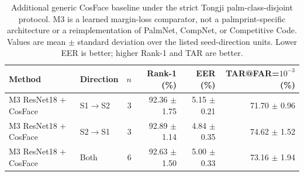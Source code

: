 \begin{table}[t]
\centering
\caption{Additional generic CosFace baseline under the strict Tongji palm-class-disjoint protocol. M3 is a learned margin-loss comparator, not a palmprint-specific architecture or a reimplementation of PalmNet, CompNet, or Competitive Code. Values are mean $\pm$ standard deviation over the listed seed-direction units. Lower EER is better; higher Rank-1 and TAR are better.}
\label{tab:strict_tongji_additional_baselines}
\small
\setlength{\tabcolsep}{4pt}
\begin{tabular}{llrrrr}
\toprule
Method & Direction & $n$ & Rank-1 (\%) & EER (\%) & TAR@FAR=$10^{-3}$ (\%) \\
\midrule
M3 ResNet18 + CosFace & S1$\rightarrow$S2 & 3 & 92.36 $\pm$ 1.75 & 5.15 $\pm$ 0.21 & 71.70 $\pm$ 0.96 \\
M3 ResNet18 + CosFace & S2$\rightarrow$S1 & 3 & 92.89 $\pm$ 1.14 & 4.84 $\pm$ 0.35 & 74.62 $\pm$ 1.52 \\
M3 ResNet18 + CosFace & Both & 6 & 92.63 $\pm$ 1.50 & 5.00 $\pm$ 0.33 & 73.16 $\pm$ 1.94 \\
\bottomrule
\end{tabular}
\end{table}

